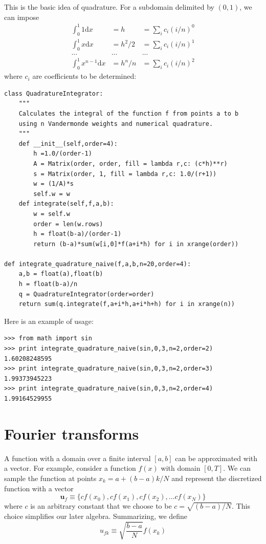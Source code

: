 \documentclass[justified,sixbynine]{tufte-book}
\def\ft{\small\tt}
\theoremstyle{plain}%
\theoremstyle{definition}
\theoremstyle{remark}
\begin{document}
\begin{fullwidth}
This is the basic idea of quadrature. For a subdomain delimited by $(0,1)$, we can impose
\begin{eqnarray}
\int_0^1 1\textrm{d}x &= h &= \sum_i c_i (i/n)^0 \\
\int_0^1 x\textrm{d}x &= h^2/2 &= \sum_i c_i (i/n)^1 \\
... & ... & ... \\
\int_0^1 x^{n-1}\textrm{d}x &= h^n/n &= \sum_i c_i (i/n)^2
\end{eqnarray}
where $c_i$ are coefficients to be determined:


\begin{lstlisting}[caption={in file: {\ft nlib.py}}]
class QuadratureIntegrator:
    """
    Calculates the integral of the function f from points a to b
    using n Vandermonde weights and numerical quadrature.
    """
    def __init__(self,order=4):
        h =1.0/(order-1)
        A = Matrix(order, order, fill = lambda r,c: (c*h)**r)
        s = Matrix(order, 1, fill = lambda r,c: 1.0/(r+1))
        w = (1/A)*s
        self.w = w
    def integrate(self,f,a,b):
        w = self.w
        order = len(w.rows)
        h = float(b-a)/(order-1)
        return (b-a)*sum(w[i,0]*f(a+i*h) for i in xrange(order))

def integrate_quadrature_naive(f,a,b,n=20,order=4):
    a,b = float(a),float(b)
    h = float(b-a)/n
    q = QuadratureIntegrator(order=order)
    return sum(q.integrate(f,a+i*h,a+i*h+h) for i in xrange(n))
\end{lstlisting}

Here is an example of usage:

\begin{lstlisting}[caption={in file: {\ft nlib.py}}]
>>> from math import sin
>>> print integrate_quadrature_naive(sin,0,3,n=2,order=2)
1.60208248595
>>> print integrate_quadrature_naive(sin,0,3,n=2,order=3)
1.99373945223
>>> print integrate_quadrature_naive(sin,0,3,n=2,order=4)
1.99164529955
\end{lstlisting}

\newpage
\section{Fourier transforms}

A function with a domain over a finite interval $[a,b]$ can be approximated with a vector. For example, consider a function $f(x)$ with domain $[0,T]$. We can sample the function at points $x_k = a+(b-a)k/N$ and represent the discretized function with a vector
\begin{equation}
\mathbf{u}_f \equiv \{cf(x_0), cf(x_1), cf(x_2), ... cf(x_N)\}
\end{equation}
where $c$ is an arbitrary constant that we choose to be $c=\sqrt{(b-a)/N}$. This choice simplifies our later algebra.
Summarizing, we define
\begin{equation}
u_{fk} \equiv \sqrt{\frac{b-a}{N}}f(x_k)
\end{equation}


\end{fullwidth}
\end{document}
